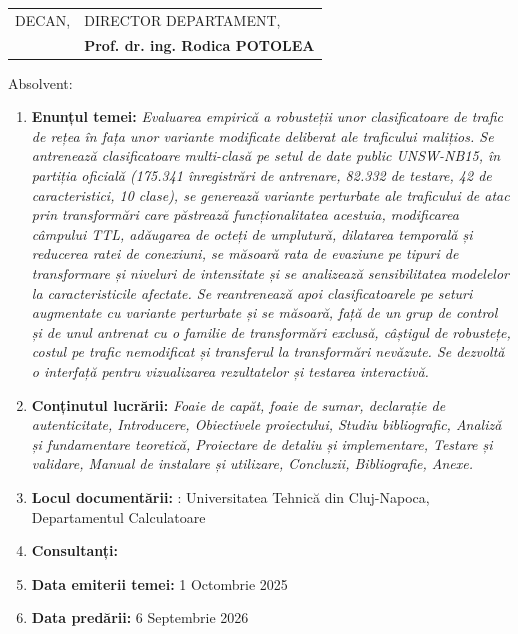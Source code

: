 \begin{tabular}{p{7cm}p{8cm}}
	\hspace{-1cm}DECAN, & DIRECTOR DEPARTAMENT,\\
	\hspace{-1cm}{\bf Prof. dr. ing. Vlad MUREȘAN} & {\bf Prof. dr. ing. Rodica POTOLEA}\\  
\end{tabular}

\vspace{2cm}

\begin{center}
	Absolvent: {\bf \thesisauthor}
	
	\vspace{1cm}
	
	{\bf \thesistitle}
\end{center}

\vspace{5mm}
\begin{enumerate}
	\item {\bf Enunțul temei:} {\it Evaluarea empirică a robusteții unor clasificatoare de
	trafic de rețea în fața unor variante modificate deliberat ale traficului malițios.
	Se antrenează clasificatoare multi-clasă pe setul de date public UNSW-NB15, în
	partiția oficială (175.341 înregistrări de antrenare, 82.332 de testare, 42 de
	caracteristici, 10 clase), se generează variante perturbate ale traficului de atac
	prin transformări care păstrează funcționalitatea acestuia, modificarea câmpului
	TTL, adăugarea de octeți de umplutură, dilatarea temporală și reducerea ratei de
	conexiuni, se măsoară rata de evaziune pe tipuri de transformare și niveluri de
	intensitate și se analizează sensibilitatea modelelor la caracteristicile afectate.
	Se reantrenează apoi clasificatoarele pe seturi augmentate cu variante perturbate și
	se măsoară, față de un grup de control și de unul antrenat cu o familie de
	transformări exclusă, câștigul de robustețe, costul pe trafic nemodificat și
	transferul la transformări nevăzute.
	Se dezvoltă o interfață pentru vizualizarea rezultatelor și testarea interactivă.}
	\item {\bf Conținutul lucrării:} {\it Foaie de capăt, foaie de sumar, declarație de
	autenticitate, Introducere, Obiectivele proiectului, Studiu bibliografic, Analiză
	și fundamentare teoretică, Proiectare de detaliu și implementare, Testare și
	validare, Manual de instalare și utilizare, Concluzii, Bibliografie, Anexe.}
	\item {\bf Locul documentării:} {\it}: Universitatea Tehnică din Cluj-Napoca, Departamentul Calculatoare
	\item {\bf Consultanți:}
	\item {\bf Data emiterii temei:} 1 Octombrie 2025 %
	\item {\bf Data predării:} 6 Septembrie 2026 %
\end{enumerate}
\vspace{1.2cm}

